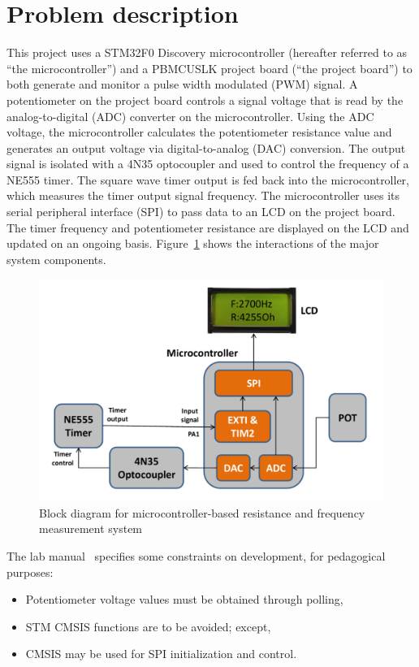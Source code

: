 \section{Problem description}\label{sec:problem-descr}
This project uses a STM32F0 Discovery microcontroller (hereafter referred to as ``the microcontroller'') and a PBMCUSLK project board (``the project board'') to both generate and monitor a pulse width modulated (PWM) signal.
A potentiometer on the project board controls a signal voltage that is read by the analog-to-digital (ADC) converter on the microcontroller.
Using the ADC voltage, the microcontroller calculates the potentiometer resistance value and generates an output voltage via digital-to-analog (DAC) conversion.
The output signal is isolated with a 4N35 optocoupler and used to control the frequency of a NE555 timer.
The square wave timer output is fed back into the microcontroller, which measures the timer output signal frequency.
The microcontroller uses its serial peripheral interface (SPI) to pass data to an LCD on the project board.
The timer frequency and potentiometer resistance are displayed on the LCD and updated on an ongoing basis.
Figure~\ref{fig:systemblocks} shows the interactions of the major system components.

\begin{figure}[tbph]
  \centering
  \includegraphics[width=0.7\linewidth]{../graphics/system_blocks}
  \caption{Block diagram for microcontroller-based resistance and frequency measurement system~\cite{lab-manual}}
  \label{fig:systemblocks}
\end{figure}

The lab manual~\cite{lab-manual} specifies some constraints on development, for pedagogical purposes:
\begin{itemize}
  \item Potentiometer voltage values must be obtained through polling,
  \item STM CMSIS functions are to be avoided; except,
  \item CMSIS may be used for SPI initialization and control.
\end{itemize}
